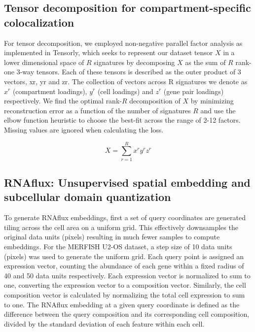 \subsection{Tensor decomposition for compartment-specific colocalization}
For tensor decomposition, we employed non-negative parallel factor analysis as implemented in Tensorly\cite{kossaifiTensorLyTensorLearning2019}, which seeks to represent our dataset tensor \(X\) in a lower dimensional space of \(R\) signatures by decomposing \(X\) as the sum of \(R\) rank-one 3-way tensors. Each of these tensors is described as the outer product of 3 vectors, xr, yr and zr. The collection of vectors across R signatures we denote as \(x^r\) (compartment loadings), \(y^r\) (cell loadings) and \(z^r\) (gene pair loadings) respectively. We find the optimal rank-\(R\) decomposition of \(X\) by minimizing reconstruction error as a function of the number of signatures \(R\) and use the elbow function heuristic to choose the best-fit across the range of 2-12 factors. Missing values are ignored when calculating the loss.

\[X = \sum_{r=1}^{R} x^r y^r z^r\]

\subsection{RNAflux: Unsupervised spatial embedding and subcellular domain quantization}
To generate RNAflux embeddings, first a set of query coordinates are generated tiling across the cell area on a uniform grid. This effectively downsamples the original data units (pixels) resulting in much fewer samples to compute embeddings. For the MERFISH U2-OS dataset, a step size of 10 data units (pixels) was used to generate the uniform grid. Each query point is assigned an expression vector, counting the abundance of each gene within a fixed radius of 40 and 50 data units respectively. Each expression vector is normalized to sum to one, converting the expression vector to a composition vector. Similarly, the cell composition vector is calculated by normalizing the total cell expression to sum to one. The RNAflux embedding at a given query coordinate is defined as the difference between the query composition and its corresponding cell composition, divided by the standard deviation of each feature within each cell. 

